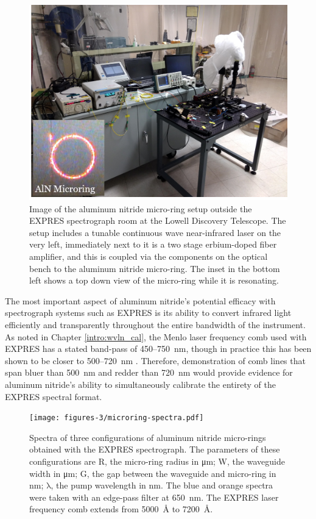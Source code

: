 \begin{figure}
    \centering
    \includegraphics[width=\textwidth]{figures-3/microring-setup.png}
    \caption[Aluminum nitride micro-ring at the Lowell Discovery Telescope]{Image of the aluminum nitride micro-ring setup outside the EXPRES spectrograph room at the Lowell Discovery Telescope. The setup includes a tunable continuous wave near-infrared laser on the very left, immediately next to it is a two stage erbium-doped fiber amplifier, and this is coupled via the components on the optical bench to the aluminum nitride micro-ring. The inset in the bottom left shows a top down view of the micro-ring while it is resonating.}
    \label{fig:microring-setup}
\end{figure}

The most important aspect of aluminum nitride's potential efficacy with spectrograph systems such as EXPRES is its ability to convert infrared light efficiently and transparently throughout the entire bandwidth of the instrument. As noted in Chapter \ref{intro:wvln_cal}, the Menlo laser frequency comb used with EXPRES has a stated band-pass of 450--750~\si{\nano\meter}, though in practice this has been shown to be closer to 500--720~\si{\nano\meter} \citep{blackman_performance_2020}. Therefore, demonstration of comb lines that span bluer than 500~\si{\nano\meter} and redder than 720~\si{\nano\meter} would provide evidence for aluminum nitride's ability to simultaneously calibrate the entirety of the EXPRES spectral format.

\begin{figure}
    \centering
    \texttt{[image: figures-3/microring-spectra.pdf]}
    \caption[EXPRES-measured spectra from aluminum nitride micro-rings]{Spectra of three configurations of aluminum nitride micro-rings obtained with the EXPRES spectrograph. The parameters of these configurations are R, the micro-ring radius in \si{\micro\meter}; W, the waveguide width in \si{\micro\meter}; G, the gap between the waveguide and micro-ring in \si{\nano\meter}; $\mathrm{\lambda}$, the pump wavelength in \si{\nano\meter}. The blue and orange spectra were taken with an edge-pass filter at 650~\si{\nano\meter}. The EXPRES laser frequency comb extends from 5000~\si{\angstrom} to 7200~\si{\angstrom}.}
    \label{fig:microring-spectra}
\end{figure}

